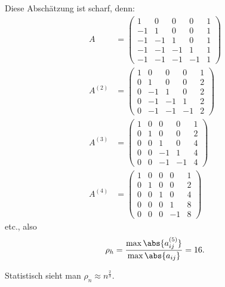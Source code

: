 Diese Abschätzung ist scharf, denn:
\begin{align*}
A & = \begin{pmatrix}
1& 0& 0& 0& 1\\
-1& 1& 0& 0 &1\\
-1& -1& 1& 0&1 \\
-1& -1& -1&1&1\\
-1&-1&-1&-1&1
\end{pmatrix}\\
%
A^{(2)}
& = \begin{pmatrix}
1& 0& 0& 0& 1\\
0& 1& 0& 0 &2\\
0& -1& 1& 0&2 \\
0& -1& -1&1&2\\
0&-1&-1&-1&2
\end{pmatrix}\\
%
A^{(3)}
& = \begin{pmatrix}
1& 0& 0& 0& 1\\
0& 1& 0& 0 &2\\
0& 0& 1& 0&4 \\
0& 0& -1&1&4\\
0&0&-1&-1&4
\end{pmatrix}\\
%
A^{(4)} & =
\begin{pmatrix}
1& 0& 0& 0& 1\\
0& 1& 0& 0 &2\\
0& 0& 1& 0&4 \\
0& 0& 0&1&8\\
0&0&0&-1&8
\end{pmatrix}
\end{align*}
etc., also
\begin{equation*}
 \rho_h = \frac{\max \abs{a^{(5)}_{ij}}}{\max \abs{a_{ij}}} = 16.
\end{equation*}

Statistisch sieht man $\rho_n \approx n^{\frac{2}{3}}$.

